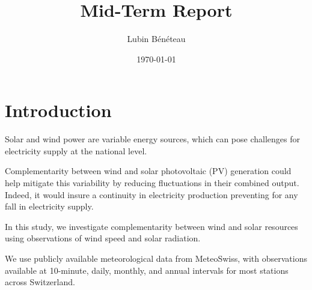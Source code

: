 \documentclass[11pt,a4paper]{article}
\title{Mid-Term Report}
\author{Lubin Bénéteau}
\date{\today}
\begin{document}
\maketitle

\section{Introduction}


Solar and wind power are variable energy sources, which can pose challenges for electricity supply at the national level.

Complementarity between wind and solar photovoltaic (PV) generation could help mitigate this variability by reducing fluctuations in their combined output. Indeed, it would insure a continuity in electricity production preventing for any fall in electricity supply.

In this study, we investigate complementarity between wind and solar resources using observations of wind speed and solar radiation.


We use publicly available meteorological data from MeteoSwiss, with observations available at 10-minute, daily, monthly, and annual intervals for most stations across Switzerland.
\end{document}
